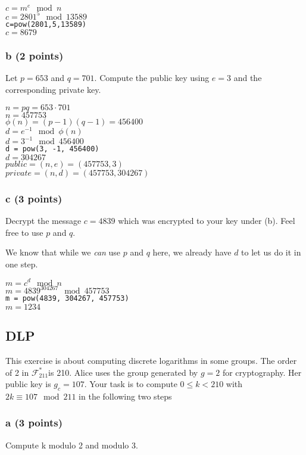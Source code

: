 \documentclass{article}
\begin{document}
$c=m^e \mod n$ \\
$c=2801^5 \mod 13589$ \\
\verb|c=pow(2801,5,13589)| \\
$c=8679$

\subsubsection{b (2 points)}
Let $p = 653$ and $q = 701$. Compute the public key
using $e = 3$ and the corresponding private key.

$n = pq = 653 \cdot 701$ \\
$n = 457753$ \\
$\phi(n) = (p-1)(q-1) = 456400$ \\
$d = e^{-1} \mod \phi(n)$ \\
$d = 3^{-1} \mod 456400$ \\
\verb|d = pow(3, -1, 456400)| \\
$d = 304267$ \\

$public = (n,e) = (457753, 3)$ \\
$private = (n,d)= (457753, 304267)$ \\


\subsubsection{c (3 points)}
Decrypt the message $c = 4839$ which was encrypted to your key under (b). Feel
free to use $p$ and $q$.

We know that while we \textit{can} use $p$ and $q$ here, we already have $d$ to let
us do it in one step.

$m=c^d \mod n$ \\
$m=4839^{304267} \mod 457753$ \\
\verb|m = pow(4839, 304267, 457753)| \\
$m = 1234$

\subsection{DLP}
This exercise is about computing discrete logarithms in some groups.
The order of 2 in $\mathcal{F}_{211}^{*}$is 210. Alice uses the group generated
by $g = 2$ for cryptography. Her public key is $g_c = 107$.
Your task is to compute $0 \leq k < 210$ with $2k \equiv 107 \mod 211$ in the following two steps

\subsubsection{a (3 points)}
Compute k modulo 2 and modulo 3.
\end{document}
